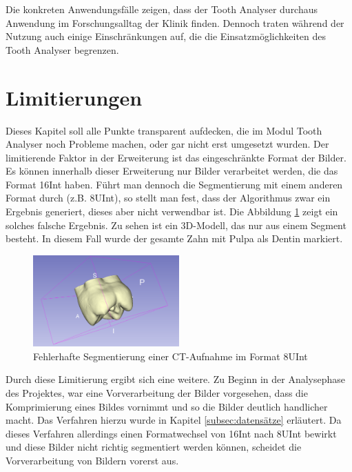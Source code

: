 Die konkreten Anwendungsfälle zeigen, dass der Tooth Analyser durchaus Anwendung
im Forschungsalltag der Klinik finden. Dennoch traten während der Nutzung auch einige
Einschränkungen auf, die die Einsatzmöglichkeiten des Tooth Analyser begrenzen.

\section{Limitierungen}
\label{sec:limitierungen} Dieses Kapitel soll alle Punkte transparent aufdecken,
die im Modul Tooth Analyser noch Probleme machen, oder gar nicht erst umgesetzt
wurden. Der limitierende Faktor in der Erweiterung ist das eingeschränkte Format
der Bilder. Es können innerhalb dieser Erweiterung nur Bilder verarbeitet werden,
die das Format \ac{16Int} haben. Führt man dennoch die Segmentierung mit einem anderen
Format durch (z.B. \ac{8UInt}), so stellt man fest, dass der Algorithmus zwar ein
Ergebnis generiert, dieses aber nicht verwendbar ist. Die Abbildung \ref{fig:3d_error}
zeigt ein solches falsche Ergebnis. Zu sehen ist ein \ac{3D}-Modell, das nur aus einem
Segment besteht. In diesem Fall wurde der gesamte Zahn mit Pulpa als Dentin
markiert.

\begin{figure}[h]
	\centering
	\includegraphics[width=0.5\textwidth]{img/3d_view_error.png}
	\caption{Fehlerhafte Segmentierung einer CT-Aufnahme im Format 8UInt}
	\label{fig:3d_error}
\end{figure}

Durch diese Limitierung ergibt sich eine weitere. Zu Beginn in der Analysephase
des Projektes, war eine Vorverarbeitung der Bilder vorgesehen, dass die
Komprimierung eines Bildes vornimmt und so die Bilder deutlich handlicher macht.
Das Verfahren hierzu wurde in Kapitel \ref{subsec:datensätze} erläutert. Da
dieses Verfahren allerdings einen Formatwechsel von \ac{16Int} nach \ac{8UInt}
bewirkt und diese Bilder nicht richtig segmentiert werden können, scheidet die Vorverarbeitung
von Bildern vorerst aus.

